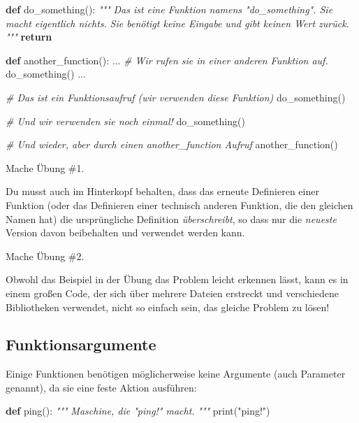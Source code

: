 \documentclass[
]{book}
\newenvironment{Shaded}{\begin{snugshade}}{\end{snugshade}}
\newcommand{\BuiltInTok}[1]{#1}
\newcommand{\CommentTok}[1]{\textcolor[rgb]{0.56,0.35,0.01}{\textit{#1}}}
\newcommand{\ControlFlowTok}[1]{\textcolor[rgb]{0.13,0.29,0.53}{\textbf{#1}}}
\newcommand{\KeywordTok}[1]{\textcolor[rgb]{0.13,0.29,0.53}{\textbf{#1}}}
\newcommand{\NormalTok}[1]{#1}
\newcommand{\StringTok}[1]{\textcolor[rgb]{0.31,0.60,0.02}{#1}}
\begin{document}
\begin{Shaded}
\begin{Highlighting}[]
\KeywordTok{def}\NormalTok{ do\_something():}
    \CommentTok{"""}
\CommentTok{    Das ist eine Funktion namens "do\_something". Sie macht eigentlich nichts.}
\CommentTok{    Sie benötigt keine Eingabe und gibt keinen Wert zurück.}
\CommentTok{    """}
    \ControlFlowTok{return}
    
\KeywordTok{def}\NormalTok{ another\_function():}
\NormalTok{    ...}
    \CommentTok{\# Wir rufen sie in einer anderen Funktion auf.}
\NormalTok{    do\_something()}
\NormalTok{    ...}

\CommentTok{\# Das ist ein Funktionsaufruf (wir verwenden diese Funktion)}
\NormalTok{do\_something()}

\CommentTok{\# Und wir verwenden sie noch einmal!}
\NormalTok{do\_something()}

\CommentTok{\# Und wieder, aber durch einen another\_function Aufruf}
\NormalTok{another\_function()}
\end{Highlighting}
\end{Shaded}

Mache Übung \#1.

Du musst auch im Hinterkopf behalten, dass das erneute Definieren einer Funktion (oder das Definieren einer technisch anderen Funktion, die den gleichen Namen hat) die ursprüngliche Definition \emph{überschreibt}, so dass nur die \emph{neueste} Version davon beibehalten und verwendet werden kann.

Mache Übung \#2.

Obwohl das Beispiel in der Übung das Problem leicht erkennen lässt, kann es in einem großen Code, der sich über mehrere Dateien erstreckt und verschiedene Bibliotheken verwendet, nicht so einfach sein, das gleiche Problem zu lösen!

\hypertarget{funktionsargumente}{%
\subsection{Funktionsargumente}\label{funktionsargumente}}

Einige Funktionen benötigen möglicherweise keine Argumente (auch Parameter genannt), da sie eine feste Aktion ausführen:

\begin{Shaded}
\begin{Highlighting}[]
\KeywordTok{def}\NormalTok{ ping():}
    \CommentTok{"""}
\CommentTok{    Maschine, die "ping!" macht.}
\CommentTok{    """}
    \BuiltInTok{print}\NormalTok{(}\StringTok{"ping!"}\NormalTok{)}
\end{Highlighting}
\end{Shaded}
\end{document}
